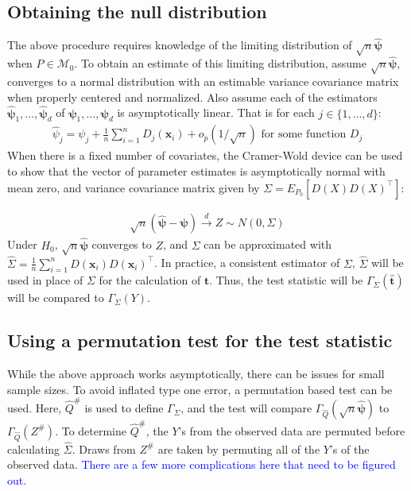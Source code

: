 \documentclass{article}
\newcommand{\vmat}{\Sigma}
\newcommand{\rvo}{X}
\newcommand{\disto}{P}
\newcommand{\tst}{\hat{\boldsymbol{t}}}
\newcommand{\rvt}{Y}
\newcommand{\rvv}{Z}
\newcommand{\distv}{Q}
\newcommand{\Gammaf}{\Gamma_{\Sigma}}
\begin{document}
\subsection{Obtaining the null distribution}
\label{ssec:obtaining_null}
The above procedure requires knowledge of the limiting distribution of $\sqrt{n}\hat{\boldsymbol{\psi}}$ when $P \in \mathscr{M}_0$.  To obtain an estimate of this limiting distribution, assume $\sqrt{n}\hat{\boldsymbol{\psi}}$, converges to a normal distribution with an estimable variance covariance matrix when properly centered and normalized. Also assume each of the estimators $\hat{\boldsymbol{\psi}}_1, \dots, \hat{\boldsymbol{\psi}}_d$ of $\boldsymbol{\psi}_1, \dots, \boldsymbol{\psi}_d$ is asymptotically linear.  That is for each $j \in \{1, \dots, d\}$:
\begin{align*}
\hat{\psi}_j = \psi_j + \frac{1}{n}\sum_{i=1}^n D_j(\boldsymbol{x}_i) + o_p(1/\sqrt{n}) \text{ for some function } D_j
\end{align*}
When there is a fixed number of covariates, the Cramer-Wold device can be used to show that the vector of parameter estimates is asymptotically normal with mean zero, and variance covariance matrix given by $\Sigma = E_{\disto_0}\left[D(\rvo) D(\rvo)^\top \right]$:

\begin{align*}
    \sqrt{n}\left(\hat{\boldsymbol{\psi}} - \boldsymbol{\psi}\right) \xrightarrow{d} \rvv \sim N\left(0, \Sigma\right)
\end{align*}
Under $H_0$, $\sqrt{n}\hat{\boldsymbol{\psi}}$ converges to $Z$, and $\Sigma$ can be approximated with $\widehat{\Sigma} = \frac{1}{n}\sum_{i = 1}^n D(\boldsymbol{x}_i) D(\boldsymbol{x}_i)^\top$.  In practice, a consistent estimator of $\vmat$, $\hat{\vmat}$ will be used in place of $\vmat$ for the calculation of $\tst$. Thus, the test statistic will be $\Gammaf(\tst)$ will be compared to $\Gammaf(\rvt)$.

\subsection{Using a permutation test for the test statistic}
While the above approach works asymptotically, there can be issues for small sample sizes.  To avoid inflated type one error, a permutation based test can be used.  Here, $\hat{\distv}^\#$ is used to define $\Gammaf$, and the test will compare $\Gamma_{\hat{\distv}}(\sqrt{n} \hat{\boldsymbol{\psi}})$ to $\Gamma_{\hat{\distv}}(\rvv^\#)$. To determine $\hat{\distv}^\#$, the $Y$'s from the observed data are permuted before calculating $\widehat \Sigma$.  Draws from $\rvv^\#$ are taken by permuting all of the $Y$'s of the observed data.  \textcolor{blue}{There are a few more complications here that need to be figured out.}
\end{document}
